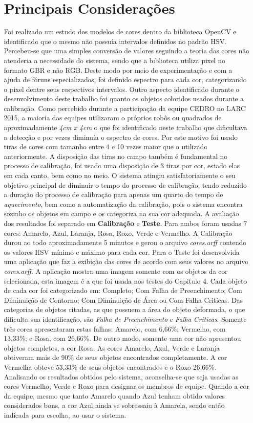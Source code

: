 \section{Principais Considerações}
	Foi realizado um estudo dos modelos de cores dentro da biblioteca OpenCV e identificado que o mesmo não possuía intervalos definidos no padrão HSV. Percebeu-se que uma simples conversão de valores seguindo a teoria das cores não atenderia a necessidade do sistema, sendo que a biblioteca utiliza pixel no formato GBR e não RGB. Deste modo por meio de experimentação e com a ajuda de fóruns especializados, foi definido espectro para cada cor, categorizando o pixel dentre seus respectivos intervalos.
	Outro aspecto identificado durante o desenvolvimento deste trabalho foi quanto os objetos coloridos usados durante a calibração. Como percebido durante a participação da equipe CEDRO no LARC 2015, a maioria das equipes utilizaram o próprios robôs ou quadrados de aproximadamente \textit{4cm x 4cm} o que foi identificado neste trabalho que dificultava a detecção e por vezes diminuía o espectro de cores. Por este motivo foi usado tiras de cores com tamanho entre 4 e 10 vezes maior que o utilizado anteriormente. A disposição das tiras no campo também é fundamental no processo de calibração, foi usado uma disposição de 3 tiras por cor, estado elas em cada canto, bem como no meio.
	O sistema atingiu satisfatoriamente o seu objetivo principal de diminuir o tempo do processo de calibração, tendo reduzido a duração do processo de calibração para apenas um quarto do tempo de \emph{aquecimento}, bem como a automatização da calibração, pois o sistema encontra sozinho os objetos em campo e os categoriza na sua cor adequada. 
A avaliação dos resultados foi separado em \textbf{Calibração} e \textbf{Teste}. Para ambos foram usadas 7 cores: Amarelo, Azul, Laranja, Rosa, Roxo, Verde e Vermelho. A Calibração durou ao todo aproximadamente 5 minutos e gerou o arquivo \textit{cores.arff} contendo os valores HSV mínimo e máximo para cada cor. Para o Teste foi desenvolvida uma aplicação que faz a exibição das cores de acordo com seus valores no arquivo \textit{cores.arff}. A aplicação mostra uma imagem somente com os objetos da cor selecionada, esta imagem é a que foi usada nos testes do Capitulo 4. Cada objeto de cada cor foi categorizado em: Completo; Com Falha de Preenchimento; Com Diminuição de Contorno; Com Diminuição de Área ou Com Falha Criticas. Das categorias de objetos citadas, as que possuem a área do objeto deformada, o que dificulta sua identificação, são \textit{Falha de Preenchimento} e \textit{Falha Criticas}. Somente tr\^{e}s cores apresentaram estas falhas: Amarelo, com 6,66\%; Vermelho, com 13,33\%; e Rosa, com 26,66\%. De outro modo, somente uma cor não apresentou objetos completos, a cor Rosa. As cores Amarelo, Azul, Verde e Laranja obtiveram mais de 90\% de seus objetos encontrados completamente. A cor Vermelha obteve 53,33\% de seus objetos encontrados e o Roxo 26,66\%. 
Analisando os resultados obtidos pelo sistema, aconselha-se que seja usadas as cores Vermelho, Verde e Roxo para designar os membros de equipe. Quando a cor da equipe, mesmo que tanto Amarelo quando Azul tenham obtido valores considerados bons, a cor Azul ainda se sobressaiu à Amarela, sendo então indicada para escolha, ao usar o sistema. 

